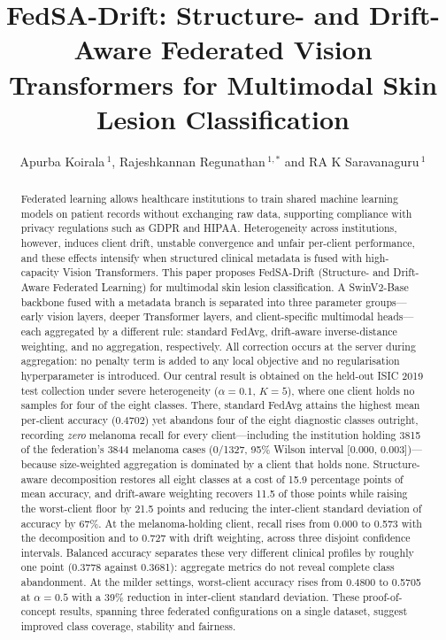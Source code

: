 \documentclass[utf8]{FrontiersinHarvard} %
\newcommand{\sadrift}{FedSA-Drift}
\def\firstAuthorLast{Koirala {et~al.}} %
\def\Authors{Apurba Koirala\,$^{1}$, Rajeshkannan Regunathan\,$^{1,*}$ and RA K Saravanaguru\,$^{1}$}
\begin{document}
\raggedbottom
\onecolumn
{}

\title[FedSA-Drift]{FedSA-Drift: Structure- and Drift-Aware Federated Vision Transformers for Multimodal Skin Lesion Classification}

\author[\firstAuthorLast ]{\Authors}
\address{}
\correspondance{}

\extraAuth{}

\maketitle

\begin{abstract}
\sloppy
Federated learning allows healthcare institutions to train shared machine learning models on patient records without exchanging raw data, supporting compliance with privacy regulations such as GDPR and HIPAA. Heterogeneity across institutions, however, induces client drift, unstable convergence and unfair per-client performance, and these effects intensify when structured clinical metadata is fused with high-capacity Vision Transformers. This paper proposes \sadrift{} (Structure- and Drift-Aware Federated Learning) for multimodal skin lesion classification. A SwinV2-Base backbone fused with a metadata branch is separated into three parameter groups---early vision layers, deeper Transformer layers, and client-specific multimodal heads---each aggregated by a different rule: standard FedAvg, drift-aware inverse-distance weighting, and no aggregation, respectively. All correction occurs at the server during aggregation: no penalty term is added to any local objective and no regularisation hyperparameter is introduced. Our central result is obtained on the held-out ISIC 2019 test collection under severe heterogeneity ($\alpha = 0.1$, $K = 5$), where one client holds no samples for four of the eight classes. There, standard FedAvg attains the highest mean per-client accuracy (0.4702) yet abandons four of the eight diagnostic classes outright, recording \emph{zero} melanoma recall for every client---including the institution holding 3815 of the federation's 3844 melanoma cases (0/1327, 95\% Wilson interval [0.000, 0.003])---because size-weighted aggregation is dominated by a client that holds none. Structure-aware decomposition restores all eight classes at a cost of 15.9 percentage points of mean accuracy, and drift-aware weighting recovers 11.5 of those points while raising the worst-client floor by 21.5 points and reducing the inter-client standard deviation of accuracy by 67\%. At the melanoma-holding client, recall rises from 0.000 to 0.573 with the decomposition and to 0.727 with drift weighting, across three disjoint confidence intervals. Balanced accuracy separates these very different clinical profiles by roughly one point (0.3778 against 0.3681): aggregate metrics do not reveal complete class abandonment. At the milder settings, worst-client accuracy rises from 0.4800 to 0.5705 at $\alpha = 0.5$ with a 39\% reduction in inter-client standard deviation. These proof-of-concept results, spanning three federated configurations on a single dataset, suggest improved class coverage, stability and fairness.


\end{abstract}
\end{document}
